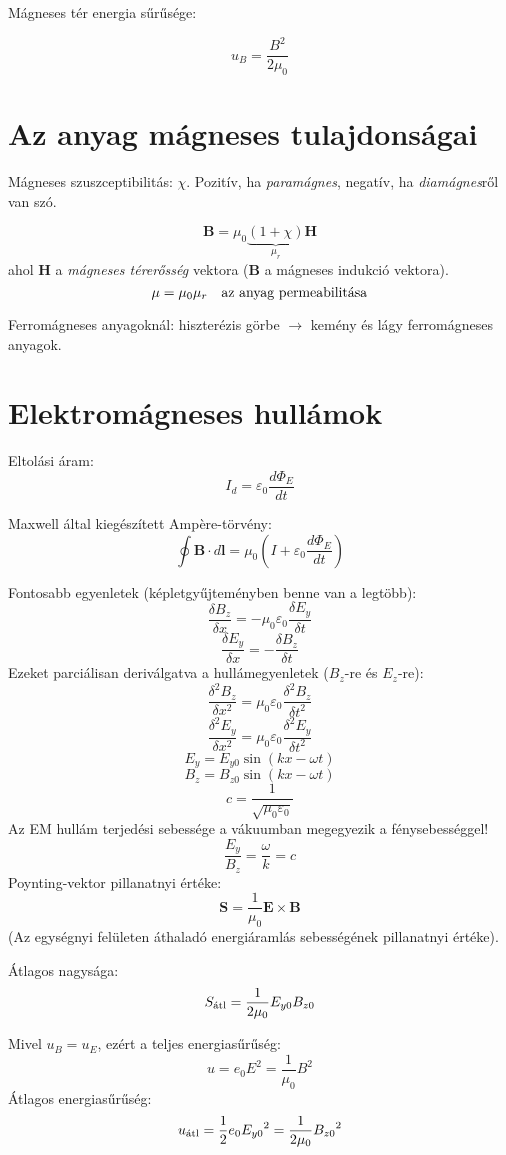 \documentclass[12pt,a4paper,twocolumn]{article}
\begin{document}
  Mágneses tér energia sűrűsége:

  \[u_B = \frac{B^2}{2\mu_0}\]

  \section{Az anyag mágneses tulajdonságai}

  Mágneses szuszceptibilitás: $\chi$. Pozitív, ha \textit{paramágnes}, negatív, ha \textit{diamágnes}ről van szó.

  \[\mathbf{B} = \mu_0\underbrace{(1+\chi)}_{\mu_r}\mathbf{H}\]
  ahol $\mathbf{H}$ a \textit{mágneses térerősség} vektora ($\mathbf{B}$ a mágneses indukció vektora).
  \[\mu = \mu_0\mu_r \quad \hbox{az anyag permeabilitása}\]

  Ferromágneses anyagoknál: hiszterézis görbe $\to$ kemény és lágy ferromágneses anyagok.

  \section{Elektromágneses hullámok}

  Eltolási áram:
  \[I_d = \varepsilon_0 \frac{d\Phi_E}{dt}\]

  Maxwell által kiegészített Ampère-törvény:
  \[\boxed{\oint \mathbf{B}\cdot d\mathbf{l} = \mu_0\left(I + \varepsilon_0\frac{d\Phi_E}{dt}\right)}\]

  Fontosabb egyenletek (képletgyűjteményben benne van a legtöbb):
  \[\frac{\delta B_z}{\delta x} = -\mu_0\varepsilon_0\frac{\delta E_y}{\delta t}\]
  \[\frac{\delta E_y}{\delta x} = -\frac{\delta B_z}{\delta  t}\]
  Ezeket parciálisan deriválgatva a hullámegyenletek ($B_z$-re és $E_z$-re):
  \[\frac{\delta^2 B_z}{\delta x^2} = \mu_0\varepsilon_0\frac{\delta^2 B_z}{\delta t^2}\]
  \[\frac{\delta^2 E_y}{\delta x^2} = \mu_0\varepsilon_0\frac{\delta^2 E_y}{\delta t^2}\]
  \[E_y = E_{y0} \sin(kx - \omega t)\]
  \[B_z = B_{z0} \sin(kx - \omega t)\]
  \[c = \frac{1}{\sqrt{\mu_0\varepsilon_0}}\]
  Az EM hullám terjedési sebessége a vákuumban megegyezik a fénysebességgel!
  \[\frac{E_y}{B_z} = \frac{\omega}{k} = c\]
  Poynting-vektor pillanatnyi értéke:
	\[\mathbf{S} = \frac{1}{\mu_0} \mathbf{E}\times\mathbf{B}\]
  (Az egységnyi felületen áthaladó energiáramlás sebességének pillanatnyi értéke).

  Átlagos nagysága:
  \[S_{\hbox{\scriptsize átl}} = \frac{1}{2\mu_0}E_{y0}B_{z0}\]

  Mivel $u_B=u_E$, ezért a teljes energiasűrűség:
  \[u = e_0E^2 = \frac{1}{\mu_0}B^2\]
  Átlagos energiasűrűség:
  \[u_{\hbox{\scriptsize átl}} = \frac{1}{2}e_0{E_{y0}}^2 = \frac{1}{2\mu_0}{B_{z0}}^2\]
\end{document}
